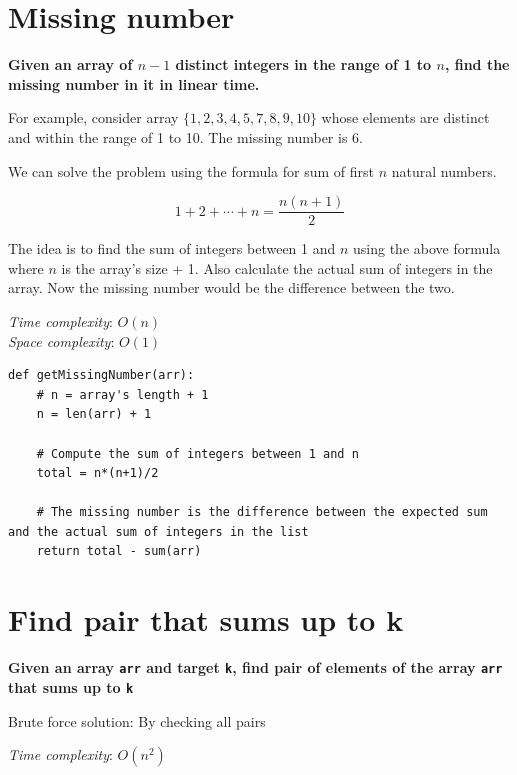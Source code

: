 \documentclass[a4paper,11pt]{book}
\begin{document}
\newpage
\section{Missing number}

\textbf{Given an array of $n-1$ distinct integers in the range of 1 to $n$, find the missing number in it in linear time.}
\vspace{5mm}

\noindent For example, consider array $\{1, 2, 3, 4, 5, 7, 8, 9, 10\}$ whose elements are distinct and within the range of 1 to 10. The missing number is 6.

\vspace{5mm}

\noindent We can solve the problem using the formula for sum of first $n$ natural numbers.

$$1 + 2 + \cdots + n = \dfrac{n(n+1)}{2}$$

\noindent The idea is to find the sum of integers between 1 and $n$ using the above formula where $n$ is the array's size + 1. Also calculate the actual sum of integers in the array. Now the missing number would be the difference between the two.

\noindent \textit{Time complexity}:  $O(n)$\\
\noindent \textit{Space complexity}: $O(1)$

\begin{lstlisting}
def getMissingNumber(arr):
    # n = array's length + 1
    n = len(arr) + 1
 
    # Compute the sum of integers between 1 and n
    total = n*(n+1)/2
 
    # The missing number is the difference between the expected sum and the actual sum of integers in the list
    return total - sum(arr)
\end{lstlisting}




\newpage
\section{Find pair that sums up to k}

\textbf{Given an array \lstinline{arr} and target \lstinline{k}, find pair of elements of the array \lstinline{arr} that sums up to \lstinline{k}}
\vspace{5mm}

\noindent Brute force solution: By checking all pairs

\noindent \textit{Time complexity}:  $O(n^2)$
\end{document}
